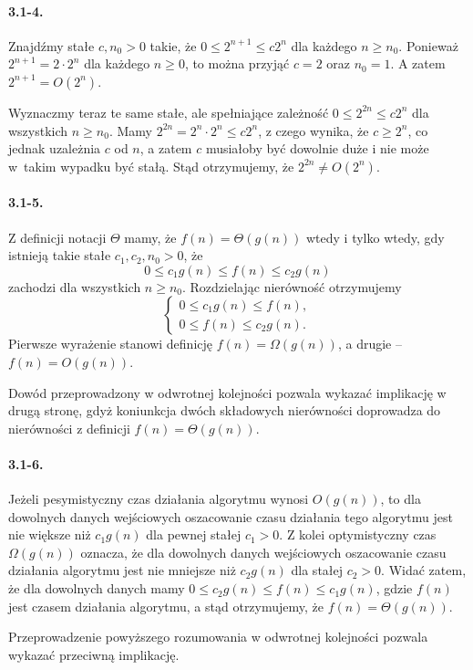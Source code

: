\paragraph{3.1-4.}
Znajdźmy stałe $c,n_0>0$ takie, że $0\le 2^{n+1}\le c2^n$ dla każdego $n\ge n_0$. Ponieważ $2^{n+1}=2\cdot 2^n$ dla każdego $n\ge 0$, to można przyjąć $c=2$ oraz $n_0=1$. A zatem $2^{n+1} = O(2^n)$.

Wyznaczmy teraz te same stałe, ale spełniające zależność $0\le 2^{2n}\le c2^n$ dla wszystkich $n\ge n_0$. Mamy $2^{2n}=2^n\cdot 2^n\le c2^n$, z czego wynika, że $c\ge 2^n$, co jednak uzależnia $c$ od $n$, a zatem $c$ musiałoby być dowolnie duże i nie może w~takim wypadku być stałą. Stąd otrzymujemy, że $2^{2n}\ne O(2^n)$.

\paragraph{3.1-5.}
Z definicji notacji $\Theta$ mamy, że $f(n)=\Theta(g(n))$ wtedy i tylko wtedy, gdy istnieją takie stałe $c_1,c_2,n_0>0$, że
\[
  0\le c_1g(n)\le f(n)\le c_2g(n)
\]
zachodzi dla wszystkich $n\ge n_0$. Rozdzielając nierówność otrzymujemy
\[
  \left\{\begin{array}{r}
	0\le c_1g(n)\le f(n), \\
	0\le f(n)\le c_2g(n).
  \end{array}\right.
\]
Pierwsze wyrażenie stanowi definicję $f(n)=\Omega(g(n))$, a drugie -- $f(n)=O(g(n))$.

Dowód przeprowadzony w odwrotnej kolejności pozwala wykazać implikację w drugą stronę, gdyż koniunkcja dwóch składowych nierówności doprowadza do nierówności z definicji $f(n)=\Theta(g(n))$.

\paragraph{3.1-6.}
Jeżeli pesymistyczny czas działania algorytmu wynosi $O(g(n))$, to dla dowolnych danych wejściowych oszacowanie czasu działania tego algorytmu jest nie większe niż $c_1g(n)$ dla pewnej stałej $c_1>0$. Z kolei optymistyczny czas $\Omega(g(n))$ oznacza, że dla dowolnych danych wejściowych oszacowanie czasu działania algorytmu jest nie mniejsze niż $c_2g(n)$ dla stałej $c_2>0$. Widać zatem, że dla dowolnych danych mamy $0\le c_2g(n)\le f(n)\le c_1g(n)$, gdzie $f(n)$ jest czasem działania algorytmu, a stąd otrzymujemy, że $f(n) = \Theta(g(n))$.

Przeprowadzenie powyższego rozumowania w odwrotnej kolejności pozwala wykazać przeciwną implikację.

